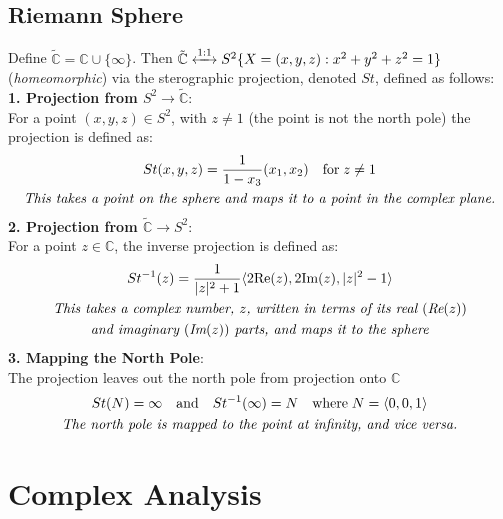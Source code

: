 \documentclass[a4paper, 10pt ]{article} %
\theoremstyle{definition}
\theoremstyle{plain}
\begin{document}
\subsection{Riemann Sphere}
Define $\tilde{\mathbb{C}} = \mathbb{C} \cup \{\infty\}$. Then $\tilde{\mathbb{C}} \xleftrightarrow{1:1} S^2 \{X = (x,y,z) : x^2 + y^2 + z^2 = 1 \}$ (\emph{homeomorphic}) via the sterographic projection, denoted $St$, defined as follows:\\[2ex]
\textbf{1. Projection from $S^2 \to \tilde{\mathbb{C}}$}: \\
For a point $(x, y,z ) \in S^2$, with $z \neq 1$ (the point is not the north pole) the projection is defined as:
\begin{gather}
  St(x, y, z) = \frac{1}{1-x_3}(x_1, x_2) \quad \text{for} \; z \neq 1 \notag \\
  \text{\emph{This takes a point on the sphere and maps it to a point in the complex plane.}} \notag
\end{gather}
\textbf{2. Projection from $\tilde{\mathbb{C}} \to S^2$}: \\
For a point $z \in \mathbb{C}$, the inverse projection is defined as:
\begin{gather}
  St^{-1}(z) = \frac{1}{|z|^2 + 1}\langle 2\text{Re}(z), 2\text{Im}(z), |z|^2 - 1 \rangle \notag  \\
  \text{\emph{This takes a complex number, $z$, written in terms of its real $($Re$(z))$}} \notag \\
  \text{\emph{and imaginary $($Im$(z))$ parts, and maps it to the sphere}} \notag
\end{gather}
\textbf{3. Mapping the North Pole}:
\\The projection leaves out the north pole from projection onto $\mathbb{C}$
\begin{gather}
  St(N)= \infty \quad \text{and} \quad St^{-1}(\infty) = N \notag \quad \text{where}\; N = \langle 0,0,1\rangle\\
  \text{\emph{The north pole is mapped to the point at infinity, and vice versa.}} \notag
\end{gather}

\pagebreak

\section{Complex Analysis}
\end{document}
